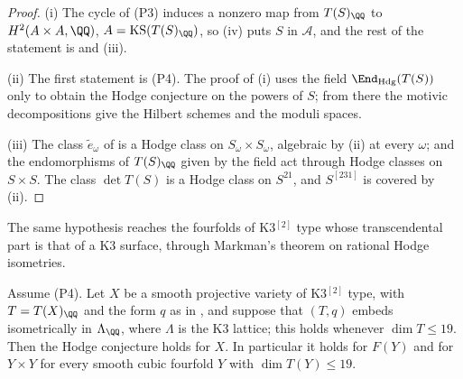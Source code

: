 \begin{proof}
(i) The cycle of (P3) induces a nonzero map from $T(S)_{\QQ}$ to
$H^{2}(A\times A,\QQ)$, $A=\mathrm{KS}(T(S)_{\QQ})$, so (iv)
puts $S$ in $\mathcal{A}$, and the rest of the statement is
 and (iii).

(ii) The first statement is (P4). The proof of (i) uses
the field $\End_{\mathrm{Hdg}}(T(S))$ only to obtain the Hodge conjecture on
the powers of $S$; from there the motivic decompositions
\cite{dCM02,Bue20,FFZ21} give the Hilbert schemes and the moduli spaces.

(iii) The class $\tilde e_{\omega}$ of  is a Hodge class on
$S_{\omega}\times S_{\omega}$, algebraic by (ii) at every $\omega$; and the
endomorphisms of $T(S)_{\QQ}$ given by the field act through Hodge classes on
$S\times S$. The class $\det T(S)$ is a Hodge class on $S^{21}$, and
$S^{[231]}$ is covered by (ii).
\end{proof}

The same hypothesis reaches the fourfolds of K3$^{[2]}$ type whose
transcendental part is that of a K3 surface, through Markman's theorem on
rational Hodge isometries.

\begin{proposition}\label{prop:k3twosmall}
Assume \textup{(P4)}. Let $X$ be a smooth projective variety of K3$^{[2]}$
type, with $T=T(X)_{\QQ}$ and the form $q$ as in , and
suppose that $(T,q)$ embeds isometrically in $\Lambda_{\QQ}$, where
$\Lambda$ is the K3 lattice; this holds whenever $\dim T\le19$. Then the
Hodge conjecture holds for $X$. In particular it holds for $F(Y)$ and for
$Y\times Y$ for every smooth cubic fourfold $Y$ with $\dim T(Y)\le19$.
\end{proposition}

